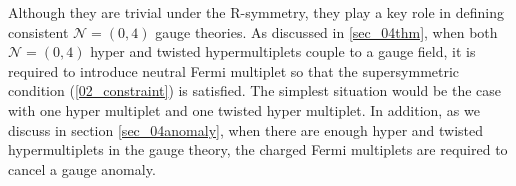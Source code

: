 \documentclass{article}
\numberwithin{equation}{section}
\begin{document}
Although they are trivial under the R-symmetry, 
they play a key role in defining consistent $\mathcal{N}=(0,4)$ gauge theories. 
As discussed in \ref{sec_04thm}, when both $\mathcal{N}=(0,4)$ hyper and twisted hypermultiplets couple to a gauge field, 
it is required to introduce neutral Fermi multiplet so that the supersymmetric condition (\ref{02_constraint}) is satisfied. 
The simplest situation would be the case with 
one hyper multiplet and one twisted hyper multiplet. 
In addition, as we discuss in section \ref{sec_04anomaly}, 
when there are enough hyper and twisted hypermultiplets in the gauge theory, 
the charged Fermi multiplets are required to cancel a gauge anomaly. 
\end{document}
